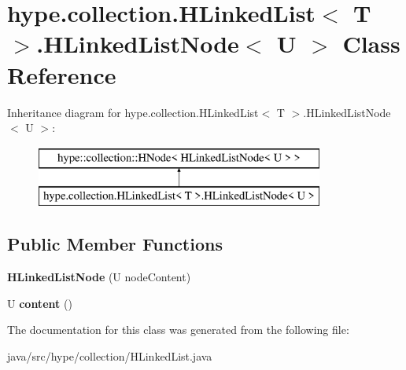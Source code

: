 \hypertarget{classhype_1_1collection_1_1_h_linked_list_3_01_t_01_4_1_1_h_linked_list_node_3_01_u_01_4}{\section{hype.\-collection.\-H\-Linked\-List$<$ T $>$.H\-Linked\-List\-Node$<$ U $>$ Class Reference}
\label{classhype_1_1collection_1_1_h_linked_list_3_01_t_01_4_1_1_h_linked_list_node_3_01_u_01_4}
}
Inheritance diagram for hype.\-collection.\-H\-Linked\-List$<$ T $>$.H\-Linked\-List\-Node$<$ U $>$\-:\begin{figure}[H]
\begin{center}
\leavevmode
\includegraphics[height=2.000000cm]{classhype_1_1collection_1_1_h_linked_list_3_01_t_01_4_1_1_h_linked_list_node_3_01_u_01_4}
\end{center}
\end{figure}
\subsection*{Public Member Functions}
\begin{DoxyCompactItemize}
\item 
\hypertarget{classhype_1_1collection_1_1_h_linked_list_3_01_t_01_4_1_1_h_linked_list_node_3_01_u_01_4_adc586b168420b82055c79703e1e05ab0}{{\bfseries H\-Linked\-List\-Node} (U node\-Content)}\label{classhype_1_1collection_1_1_h_linked_list_3_01_t_01_4_1_1_h_linked_list_node_3_01_u_01_4_adc586b168420b82055c79703e1e05ab0}

\item 
\hypertarget{classhype_1_1collection_1_1_h_linked_list_3_01_t_01_4_1_1_h_linked_list_node_3_01_u_01_4_ace9784f054eeb611469416d2d2f7a3d4}{U {\bfseries content} ()}\label{classhype_1_1collection_1_1_h_linked_list_3_01_t_01_4_1_1_h_linked_list_node_3_01_u_01_4_ace9784f054eeb611469416d2d2f7a3d4}

\end{DoxyCompactItemize}


The documentation for this class was generated from the following file\-:\begin{DoxyCompactItemize}
\item 
java/src/hype/collection/H\-Linked\-List.\-java\end{DoxyCompactItemize}
